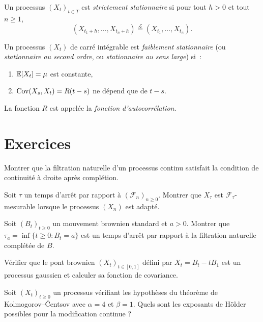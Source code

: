 \begin{definition}
Un processus $(X_t)_{t \in T}$ est \emph{strictement stationnaire} si pour tout
$h > 0$ et tout $n \geq 1$,
\[
  (X_{t_1+h}, \ldots, X_{t_n+h}) \overset{\mathcal{L}}{=} (X_{t_1}, \ldots, X_{t_n}).
\]
\end{definition}

\begin{definition}
Un processus $(X_t)$ de carr\'e int\'egrable est \emph{faiblement stationnaire}
(ou \emph{stationnaire au second ordre}, ou \emph{stationnaire au sens large}) si~:
\begin{enumerate}
  \item $\mathbb{E}[X_t] = \mu$ est constante,
  \item $\mathrm{Cov}(X_s, X_t) = R(t - s)$ ne d\'epend que de $t - s$.
\end{enumerate}
La fonction $R$ est appel\'ee la \emph{fonction d'autocorr\'elation}.
\end{definition}

\section{Exercices}

\begin{exercice}
Montrer que la filtration naturelle d'un processus continu satisfait la
condition de continuit\'e \`a droite apr\`es compl\'etion.
\end{exercice}

\begin{exercice}
Soit $\tau$ un temps d'arr\^et par rapport \`a $(\mathcal{F}_n)_{n \geq 0}$.
Montrer que $X_{\tau}$ est $\mathcal{F}_{\tau}$-mesurable lorsque le processus
$(X_n)$ est adapt\'e.
\end{exercice}

\begin{exercice}
Soit $(B_t)_{t \geq 0}$ un mouvement brownien standard et $a > 0$. Montrer que
$\tau_a = \inf\{t \geq 0 : B_t = a\}$ est un temps d'arr\^et par rapport \`a la
filtration naturelle compl\'et\'ee de $B$.
\end{exercice}

\begin{exercice}
V\'erifier que le pont brownien $(X_t)_{t \in [0,1]}$ d\'efini par
$X_t = B_t - tB_1$ est un processus gaussien et calculer sa fonction de covariance.
\end{exercice}

\begin{exercice}
Soit $(X_t)_{t \geq 0}$ un processus v\'erifiant les hypoth\`eses du th\'eor\`eme de
Kolmogorov--\v{C}entsov avec $\alpha = 4$ et $\beta = 1$. Quels sont les exposants
de H\"older possibles pour la modification continue ?
\end{exercice}

